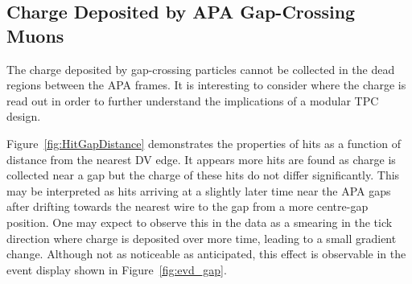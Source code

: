 \subsection{Charge Deposited by APA Gap-Crossing Muons}\label{sec:APAGapCharge}

The charge deposited by gap-crossing particles cannot be collected in the dead regions between the APA frames.  It is interesting to consider where the charge is read out in order to further understand the implications of a modular TPC design.

Figure~\ref{fig:HitGapDistance} demonstrates the properties of hits as a function of distance from the nearest DV edge.  It appears more hits are found as charge is collected near a gap but the charge of these hits do not differ significantly.  This may be interpreted as hits arriving at a slightly later time near the APA gaps after drifting towards the nearest wire to the gap from a more centre-gap position.  One may expect to observe this in the data as a smearing in the tick direction where charge is deposited over more time, leading to a small gradient change.  Although not as noticeable as anticipated, this effect is observable in the event display shown in Figure~\ref{fig:evd_gap}.

